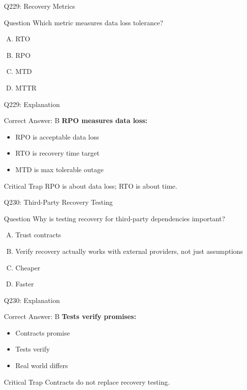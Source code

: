\documentclass{beamer}
\begin{document}
	\begin{frame}{Q229: Recovery Metrics}
		\begin{block}{Question}
			Which metric measures data loss tolerance?
		\end{block}
		\begin{enumerate}[(A)]
			\item RTO
			\item RPO
			\item MTD
			\item MTTR
		\end{enumerate}
	\end{frame}
	
	\begin{frame}{Q229: Explanation}
		\begin{block}{Correct Answer: B}
			\textbf{RPO measures data loss:}
			\begin{itemize}
				\item RPO is acceptable data loss
				\item RTO is recovery time target
				\item MTD is max tolerable outage
			\end{itemize}
		\end{block}
		\begin{alertblock}{Critical Trap}
			RPO is about data loss; RTO is about time.
		\end{alertblock}
	\end{frame}
	
	\begin{frame}{Q230: Third-Party Recovery Testing}
		\begin{block}{Question}
			Why is testing recovery for third-party dependencies important?
		\end{block}
		\begin{enumerate}[(A)]
			\item Trust contracts
			\item Verify recovery actually works with external providers, not just assumptions
			\item Cheaper
			\item Faster
		\end{enumerate}
	\end{frame}
	
	\begin{frame}{Q230: Explanation}
		\begin{block}{Correct Answer: B}
			\textbf{Tests verify promises:}
			\begin{itemize}
				\item Contracts promise
				\item Tests verify
				\item Real world differs
			\end{itemize}
		\end{block}
		\begin{alertblock}{Critical Trap}
			Contracts do not replace recovery testing.
		\end{alertblock}
	\end{frame}
	
\end{document}
